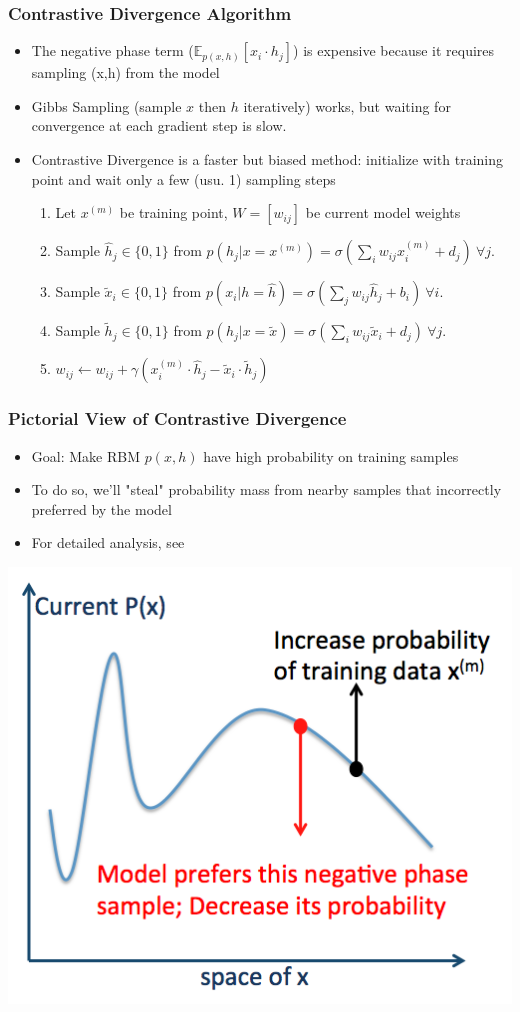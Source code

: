 \documentclass{beamer}
\newcommand{\bi}{\begin{itemize}}
\newcommand{\ei}{\end{itemize}}
\newcommand{\be}{\begin{enumerate}}
\newcommand{\ee}{\end{enumerate}}
\begin{document}
\begin{frame}
\frametitle{Contrastive Divergence Algorithm}
\bi
\item The negative phase term ($\mathbb{E}_{p(x,h)} [ x_i \cdot h_j ]$) is expensive because it requires sampling (x,h) from the model
\pause
\item Gibbs Sampling (sample $x$ then $h$ iteratively) works, but waiting for convergence at each gradient step is slow. 
\pause
\item Contrastive Divergence is a faster but biased method: initialize with training point and wait only a few (usu. 1) sampling steps
\pause
	\be
	\item Let $x^{(m)}$ be training point, $W=[w_{ij}]$ be current model weights 
	\item Sample $\hat{h}_j \in \{0,1\}$ from $p(h_j|x=x^{(m)})=\sigma(\sum_i w_{ij}x^{(m)}_i + d_j )~\forall j$.  
	\item Sample $\tilde{x}_i \in \{0,1\}$ from $p(x_i|h=\hat{h})=\sigma(\sum_j w_{ij}\hat{h}_j + b_i )~\forall i$.  
	\item Sample $\tilde{h}_j \in \{0,1\}$ from $p(h_j|x=\tilde{x})=\sigma(\sum_i w_{ij}\tilde{x}_i + d_j )~\forall j$.    
	\item $w_{ij} \leftarrow w_{ij} + \gamma( x^{(m)}_i \cdot \hat{h}_j - \tilde{x}_i \cdot \tilde{h}_j) $
	\ee
\ei
\end{frame}

\begin{frame}
\frametitle{Pictorial View of Contrastive Divergence}
\bi
\item Goal: Make RBM $p(x,h)$ have high probability on training samples
\item To do so, we'll "steal" probability mass from nearby samples that incorrectly preferred by the model
\item For detailed analysis, see \cite{carreira05cd}  
\ei
\centerline{\includegraphics[scale=0.4]{figs/contrastive_divergence}}
\end{frame}
\end{document}
